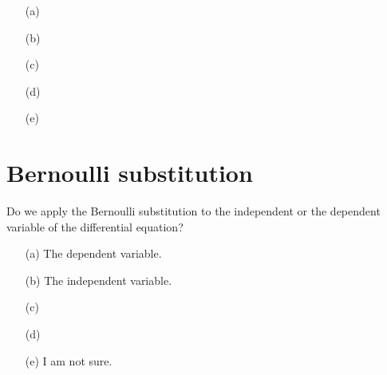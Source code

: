 \documentclass[14pt]{beamer}
\begin{document}
 

%

\begin{frame}[c]
  \thispagestyle{empty}

  \begin{itemize} \setlength\itemsep{3ex}
    \item[(a)] \underline{\hspace{4in}}
    \item[(b)] \underline{\hspace{4in}}
    \item[(c)] \underline{\hspace{4in}}
    \item[(d)] \underline{\hspace{4in}}
    \item[(e)] \underline{\hspace{4in}}
  \end{itemize} 
\end{frame}

\section{Bernoulli substitution}

\begin{frame}[t]
  Do we apply the Bernoulli substitution to the independent or the dependent variable of the differential equation?

  \begin{itemize} \setlength\itemsep{1ex}
    \item[(a)] The dependent variable.
    \item[(b)] The independent variable.
    \item[(c)] 
    \item[(d)] 
    \item[(e)] I am not sure.
  \end{itemize} 
\end{frame}
\end{document}
